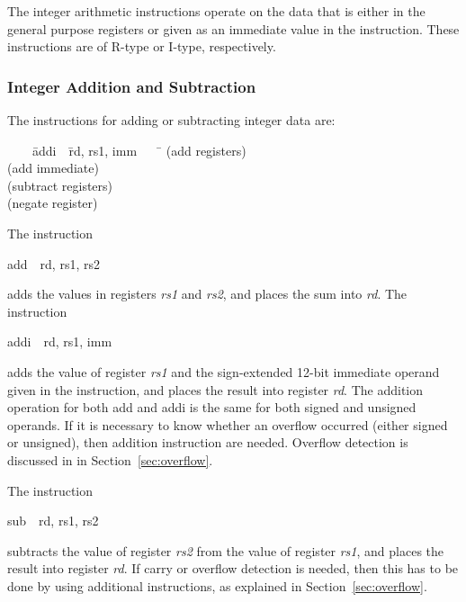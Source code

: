 \documentclass[11pt, twoside, pdftex]{article}
\newenvironment{ctabbing}%
{\begin{center}\begin{minipage}{\textwidth}\begin{tabbing}}
{\end{tabbing}\end{minipage}\end{center}}
\begin{document}
The integer arithmetic instructions operate on the data that is either in the general purpose 
registers or given as an immediate value in the instruction. These instructions are of 
R-type or I-type, respectively.

\subsubsection{Integer Addition and Subtraction}
\label{sec:addsub}

The instructions for adding or subtracting integer data are:
\vspace{-\baselineskip}
\begin{ctabbing}
~~~~\={\sf addi}~~\={\sf rd, rs1, imm}~~~~\=\kill
{}  \>(add registers)\\
  \>(add immediate)\\
  \>(subtract registers)\\
  \>(negate register)
\end{ctabbing}
\newpage
The instruction
\vspace{-\baselineskip}
\begin{center}
{\sf add~~rd, rs1, rs2}
\end{center}
\noindent
adds the values in registers {\it rs1} and {\it rs2}, and places the sum into {\it rd}.
The instruction
\vspace{-\baselineskip}
\begin{center}
{\sf addi~~rd, rs1, imm}
\end{center}

\noindent
adds the value of register {\it rs1} and the sign-extended 12-bit immediate operand given 
in the instruction, and places the result into register {\it rd}.
The addition operation for both {\sf add} and {\sf addi} is the same for both signed and 
unsigned operands. If it is necessary to know whether an overflow occurred (either signed
or unsigned), then addition instruction are needed. Overflow detection is discussed in 
in Section~\ref{sec:overflow}.

\noindent
The instruction
\vspace{-\baselineskip}
\begin{center}
{\sf sub~~rd, rs1, rs2}
\end{center}
\noindent
subtracts the value of register {\it rs2} from the value of register {\it rs1}, and places the 
result into register {\it rd}. If carry or overflow detection is needed, then this has to be 
done by using additional instructions, as explained in Section~\ref{sec:overflow}.
\end{document}
